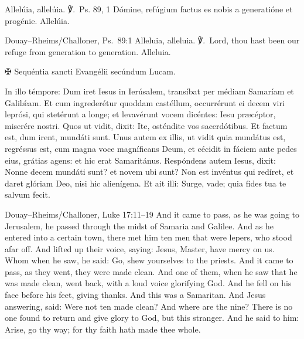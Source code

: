 Allelúia, allelúia. ℣.~Ps. 89, 1 Dómine, refúgium factus es nobis a generatióne et
progénie. Allelúia.
\finishfulltextelement
\begin{fulltextenglish}{Douay--Rheims/Challoner, Ps.~89:1}
Alleluia, alleluia. ℣.~Lord, thou hast been our refuge from generation to
generation. Alleluia.
\end{fulltextenglish}

✠ Sequéntia sancti Evangélii secúndum Lucam.

In illo témpore: Dum iret Iesus in Ierúsalem, transíbat per médiam Samaríam et
Galilǽam. Et cum ingrederétur quoddam castéllum, occurrérunt ei decem viri
leprósi, qui stetérunt a longe; et levavérunt vocem dicéntes: Iesu præcéptor,
miserére nostri. Quos ut vidit, dixit: Ite, osténdite vos sacerdótibus. Et
factum est, dum irent, mundáti sunt. Unus autem ex illis, ut vidit quia
mundátus est, regréssus est, cum magna voce magníficans Deum, et cécidit in
fáciem ante pedes eius, grátias agens: et hic erat Samaritánus. Respóndens
autem Iesus, dixit: Nonne decem mundáti sunt? et novem ubi sunt? Non est
invéntus qui redíret, et daret glóriam Deo, nisi hic alienígena. Et ait illi:
Surge, vade; quia fides tua te salvum fecit.
\finishfulltextelement
\begin{fulltextenglish}{Douay--Rheims/Challoner, Luke 17:11--19}
And it came to pass, as he was going to Jerusalem, he passed through the midst
of Samaria and Galilee. And as he entered into a certain town, there met him
ten men that were lepers, who stood afar off. And lifted up their voice,
saying: Jesus, Master, have mercy on us. Whom when he saw, he said: Go, shew
yourselves to the priests. And it came to pass, as they went, they were made
clean. And one of them, when he saw that he was made clean, went back, with a
loud voice glorifying God. And he fell on his face before his feet, giving
thanks. And this was a Samaritan. And Jesus answering, said: Were not ten made
clean? And where are the nine? There is no one found to return and give glory
to God, but this stranger. And he said to him: Arise, go thy way; for thy faith
hath made thee whole.
\end{fulltextenglish}
\par\smallskip{}

